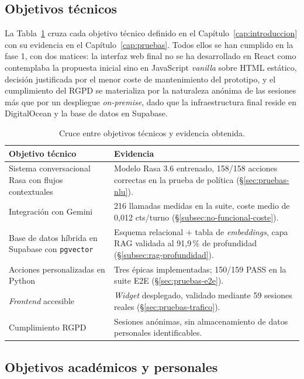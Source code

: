 \subsection{Objetivos técnicos}\label{subsec:conc-obj-tecnicos}

La Tabla~\ref{tab:cumplimiento-tecnico} cruza cada objetivo técnico definido en el Capítulo~\ref{cap:introduccion} con su evidencia en el Capítulo~\ref{cap:pruebas}. Todos ellos se han cumplido en la fase 1, con dos matices: la interfaz web final no se ha desarrollado en React como contemplaba la propuesta inicial sino en JavaScript \textit{vanilla} sobre HTML estático, decisión justificada por el menor coste de mantenimiento del prototipo, y el cumplimiento del RGPD se materializa por la naturaleza anónima de las sesiones más que por un despliegue \textit{on-premise}, dado que la infraestructura final reside en DigitalOcean y la base de datos en Supabase.

\begin{table}[hbtp]
\centering
\small
\caption{Cruce entre objetivos técnicos y evidencia obtenida.}\label{tab:cumplimiento-tecnico}
\begin{tabular}{p{6cm}p{7cm}}
\hline
\textbf{Objetivo técnico} & \textbf{Evidencia} \\
\hline
Sistema conversacional Rasa con flujos contextuales & Modelo Rasa 3.6 entrenado, 158/158 acciones correctas en la prueba de política (\S\ref{sec:pruebas-nlu}). \\
Integración con Gemini & 216 llamadas medidas en la suite, coste medio de 0,012 cts/turno (\S\ref{subsec:no-funcional-coste}). \\
Base de datos híbrida en Supabase con \texttt{pgvector} & Esquema relacional + tabla de \textit{embeddings}, capa RAG validada al 91,9\,\% de profundidad (\S\ref{subsec:rag-profundidad}). \\
Acciones personalizadas en Python & Tres épicas implementadas; 150/159 PASS en la suite E2E (\S\ref{sec:pruebas-e2e}). \\
\textit{Frontend} accesible & \textit{Widget} desplegado, validado mediante 59 sesiones reales (\S\ref{sec:pruebas-trafico}). \\
Cumplimiento RGPD & Sesiones anónimas, sin almacenamiento de datos personales identificables. \\
\hline
\end{tabular}
\end{table}

\subsection{Objetivos académicos y personales}\label{subsec:conc-obj-academicos}

